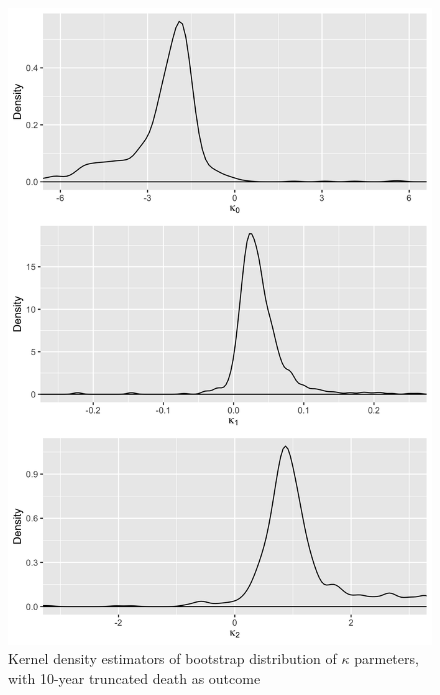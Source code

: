 \documentclass [12pt, proquest] {uwthesis}[2016/11/22]
\begin{document}
\begin{figure}
    \centering
    \includegraphics[width = 5.5 in]{PlotA_8.png}
    \caption{Kernel density estimators of bootstrap distribution of $\kappa$ parmeters, with 10-year truncated death as outcome}
\end{figure}
\end{document}
